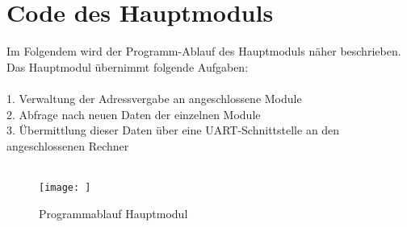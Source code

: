 \section{Code des Hauptmoduls}
\textmd{Im Folgendem wird der Programm-Ablauf des Hauptmoduls näher beschrieben.\\ 
Das Hauptmodul übernimmt folgende Aufgaben:\\\\
1. Verwaltung der Adressvergabe an angeschlossene Module\\
2. Abfrage nach neuen Daten der einzelnen Module\\
3. Übermittlung dieser Daten über eine UART-Schnittstelle an den angeschlossenen Rechner\\\\ 
}
\begin{figure}[H]
    \centering    
    \texttt{[image: ]}
    \caption{Programmablauf Hauptmodul}
    \label{Programm_Hauptmodul}
\end{figure}
\textmd{
}

